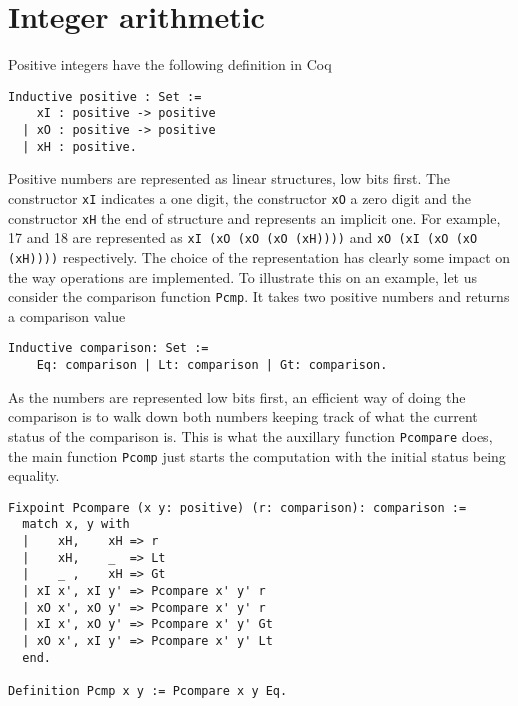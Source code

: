 \section{Integer arithmetic \label{Z}}
Positive integers have the following definition in {\sc Coq}
\begin{verbatim}
Inductive positive : Set :=
    xI : positive -> positive 
  | xO : positive -> positive 
  | xH : positive.
\end{verbatim}
Positive numbers are represented as linear structures, low bits first.
The constructor {\tt xI} indicates a one digit, the constructor {\tt xO}
a zero digit and the constructor {\tt xH} the end of structure and represents
an implicit one. For example, 17 and 18 are represented as {\tt xI (xO (xO (xO (xH))))} and
{\tt xO (xI (xO (xO (xH))))} respectively. The choice of the representation
has clearly some impact on the way operations are implemented. To illustrate this on an example,
let us consider the comparison function {\tt Pcmp}. It takes two positive numbers
and returns a comparison value
\begin{verbatim}
Inductive comparison: Set :=
    Eq: comparison | Lt: comparison | Gt: comparison.
\end{verbatim}
As the numbers are represented low bits first, an efficient way of doing the
comparison is to walk down both numbers keeping track of what the current status
of the comparison is. This is what the auxillary function {\tt Pcompare} does, the main 
function {\tt Pcomp} just starts the computation with the initial status being equality.
\begin{verbatim}
Fixpoint Pcompare (x y: positive) (r: comparison): comparison :=
  match x, y with
  |    xH,    xH => r
  |    xH,    _  => Lt
  |    _ ,    xH => Gt
  | xI x', xI y' => Pcompare x' y' r
  | xO x', xO y' => Pcompare x' y' r
  | xI x', xO y' => Pcompare x' y' Gt
  | xO x', xI y' => Pcompare x' y' Lt
  end.
  
Definition Pcmp x y := Pcompare x y Eq.
\end{verbatim}

